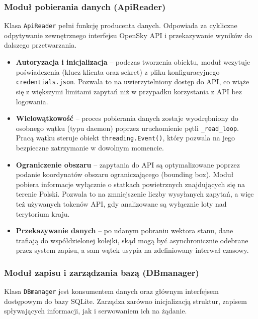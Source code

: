 \documentclass[12pt,a4paper]{article}
\begin{document}
\subsubsection{Moduł pobierania danych (ApiReader)}
Klasa \texttt{ApiReader} pełni funkcję producenta danych. Odpowiada za cykliczne odpytywanie zewnętrznego interfejsu OpenSky API i przekazywanie wyników do dalszego przetwarzania.

\begin{itemize}
    \item \textbf{Autoryzacja i inicjalizacja} – podczas tworzenia obiektu, moduł wczytuje poświadczenia (klucz klienta oraz sekret) z pliku konfiguracyjnego \texttt{credentials.json}. Pozwala to na uwierzytelniony dostęp do API, co wiąże się z większymi limitami zapytań niż w przypadku korzystania z API bez logowania.
    \item \textbf{Wielowątkowość} – proces pobierania danych zostaje wyodrębniony do osobnego wątku (typu daemon) poprzez uruchomienie pętli \texttt{\_read\_loop}. Pracą wątku steruje obiekt \texttt{threading.Event()}, który pozwala na jego bezpieczne zatrzymanie w dowolnym momencie.
    \item \textbf{Ograniczenie obszaru} – zapytania do API są optymalizowane poprzez podanie koordynatów obszaru ograniczającego (bounding box). Moduł pobiera informacje wyłącznie o statkach powietrznych znajdujących się na terenie Polski. Pozwala to na zmniejszenie liczby wysyłanych zapytań, a więc też używanych tokenów API, gdy analizowane są wyłącznie loty nad terytorium kraju.
    \item \textbf{Przekazywanie danych} – po udanym pobraniu wektora stanu, dane trafiają do współdzielonej kolejki, skąd mogą być asynchronicznie odebrane przez system zapisu, a sam wątek usypia na zdefiniowany interwał czasowy.
\end{itemize}

\subsubsection{Moduł zapisu i zarządzania bazą (DBmanager)}
Klasa \texttt{DBmanager} jest konsumentem danych oraz głównym interfejsem dostępowym do bazy SQLite. Zarządza zarówno inicjalizacją struktur, zapisem spływających informacji, jak i serwowaniem ich na żądanie.
\end{document}
